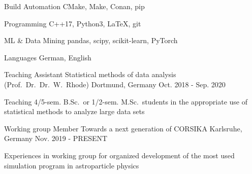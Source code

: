 \documentclass[11pt, a4paper]{Awesome-CV/awesome-cv}
\begin{document}
\begin{cvskills}
    \cvskill
    {Build Automation} %
    {CMake, Make, Conan, pip} %


    \cvskill
    {Programming} %
    {C++17, Python3, LaTeX, git} %

    \cvskill
    {ML \& Data Mining} %
    {pandas, scipy, scikit-learn, PyTorch} %

    \cvskill
    {Languages} %
    {German, English} %
\end{cvskills}

\begin{cventries}
    \cventry
    {Teaching Assistant} %
    {Statistical methods of data analysis (Prof.~Dr.~Dr.~W.~Rhode)} %
    {Dortmund, Germany} %
    {Oct. 2018 - Sep. 2020} %
    {
        \begin{cvitems} %
        \item {Teaching 4/5-sem. B.Sc.\ or 1/2-sem. M.Sc.~students in the appropriate use of statistical methods to analyze large data sets}
        \end{cvitems}
    }

    \cventry
    {Working group Member} %
    {Towards a next generation of CORSIKA} %
    {Karlsruhe, Germany} %
    {Nov. 2019 - PRESENT} %
    {
        \begin{cvitems} %
        \item {Experiences in working group for organized development of the most used simulation program in astroparticle physics}
        \end{cvitems}
    }
\end{cventries}
\end{document}
